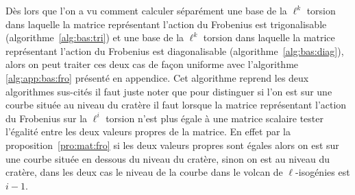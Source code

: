 \documentclass[10pt,a4paper]{book}
\theoremstyle{plain}
\theoremstyle{definition}
\theoremstyle{definition}
\theoremstyle{definition}
\theoremstyle{definition}
\theoremstyle{remark}
\theoremstyle{remark}
\theoremstyle{definition}
\begin{document}
Dès lors que l'on a vu comment calculer séparément une base de la $\ell^k$ 
torsion dans laquelle la matrice représentant l'action du Frobenius est 
trigonalisable (algorithme~\ref{alg:bas:tri}) et une base de la $\ell^k$ 
torsion dans laquelle la matrice représentant l'action du Frobenius est 
diagonalisable (algorithme~\ref{alg:bas:diag}), alors on peut traiter ces deux 
cas de façon uniforme avec l'algorithme \ref{alg:app:bas:fro} présenté en 
appendice. Cet algorithme reprend les deux algorithmes sus-cités il faut juste 
noter que pour distinguer si l'on est sur une courbe située au niveau du 
cratère il faut lorsque la matrice représentant l'action du Frobenius sur la 
$\ell^i$ torsion n'est plus égale à une matrice scalaire tester l'égalité entre
 les deux valeurs propres de la matrice. En effet par la 
 proposition~\ref{pro:mat:fro}  si les deux valeurs propres sont égales alors 
 on est sur une courbe située en dessous du niveau du cratère, sinon on est au 
 niveau du cratère, dans les deux cas le niveau de la courbe dans le volcan de 
 $\ell$-isogénies est $i-1$.
\end{document}
